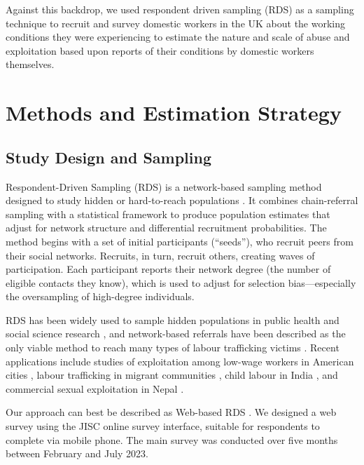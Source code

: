\documentclass[
  12pt,
  letterpaper,
  DIV=11,
  numbers=noendperiod]{scrartcl}
\theoremstyle{plain}
\theoremstyle{definition}
\begin{document}
Against this backdrop, we used respondent driven sampling (RDS) as a
sampling technique to recruit and survey domestic workers in the UK
about the working conditions they were experiencing to estimate the
nature and scale of abuse and exploitation based upon reports of their
conditions by domestic workers themselves.

\section{Methods and Estimation
Strategy}\label{methods-and-estimation-strategy}

\subsection{Study Design and Sampling}\label{study-design-and-sampling}

Respondent-Driven Sampling (RDS) is a network-based sampling method
designed to study hidden or hard-to-reach populations
\autocite{heckathorn_respondent-driven_1997,heckathorn_comment_2011,gile_methods_2018}.
It combines chain-referral sampling with a statistical framework to
produce population estimates that adjust for network structure and
differential recruitment probabilities. The method begins with a set of
initial participants (``seeds''), who recruit peers from their social
networks. Recruits, in turn, recruit others, creating waves of
participation. Each participant reports their network degree (the number
of eligible contacts they know), which is used to adjust for selection
bias---especially the oversampling of high-degree individuals.

RDS has been widely used to sample hidden populations in public health
and social science research
\autocite{mccreesh_evaluation_2012,schwitters_prevalence_2012}, and
network-based referrals have been described as the only viable method to
reach many types of labour trafficking victims
\autocite{zhang_measuring_2012}. Recent applications include studies of
exploitation among low-wage workers in American cities
\autocite{bernhardt_broken_2009}, labour trafficking in migrant
communities \autocite{vincent_estimating_2017}, child labour in India
\autocite{zhang_victims_2019}, and commercial sexual exploitation in
Nepal \autocite{jordan_overcoming_2020}.

Our approach can best be described as Web-based RDS
\autocite{wejnert_web-based_2008}. We designed a web survey using the
JISC online survey interface, suitable for respondents to complete via
mobile phone. The main survey was conducted over five months between
February and July 2023.
\end{document}
